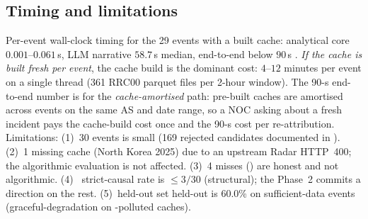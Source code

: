 \subsection{Timing and limitations}
\label{sec:timing-limitations}

Per-event wall-clock timing for the 29 events with a
built cache: analytical core $0.001$--$0.061$\,s, LLM
narrative $58.7$\,s median, end-to-end below $90$\,s
. \emph{If
the cache is built fresh per event}, the cache build is
the dominant cost: $4$--$12$ minutes per event on a
single thread (361 RRC00 parquet files per 2-hour
window). The 90-s end-to-end number is for the
\emph{cache-amortised} path: pre-built caches are
amortised across events on the same AS and date range,
so a NOC asking about a fresh incident pays the
cache-build cost once and the 90-s cost per
re-attribution. Limitations: (1)~30 events is small (169 rejected
candidates documented in ).
(2)~1 missing cache (North Korea 2025) due to an
upstream \cf{} Radar HTTP~400; the algorithmic
evaluation is not affected. (3)~4 misses
() are honest and not algorithmic.
(4)~\css{} strict-causal rate is $\leq 3/30$
(structural); the Phase~2 \hcaf{} commits a direction
on the rest. (5)~held-out set held-out is 60.0\% on
sufficient-data events (graceful-degradation on
-polluted caches).
